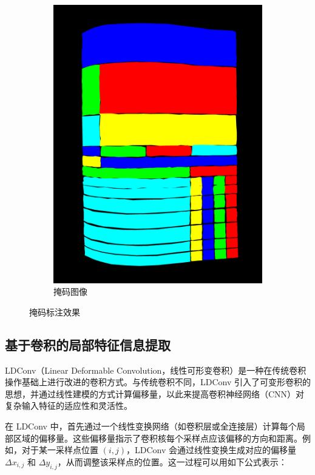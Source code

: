 \documentclass[UTF8,12pt, AutoFakeBold,fontset = founder]{ctexart}
\begin{document}
\begin{figure}[H]
\begin{subfigure}[b]{0.45\textwidth}
        \includegraphics[width=\textwidth]{../images/mask.png}
        \caption{掩码图像}
        \label{fig:mask}
    \end{subfigure}
    \caption{掩码标注效果}
    \label{fig:label}
\end{figure}

\subsection{基于卷积的局部特征信息提取}

LDConv（Linear Deformable Convolution，线性可形变卷积）是一种在传统卷积操作基础上进行改进的卷积方式。与传统卷积不同，LDConv 引入了可变形卷积的思想，并通过线性建模的方式计算偏移量，以此来提高卷积神经网络（CNN）对复杂输入特征的适应性和灵活性。

在 LDConv 中，首先通过一个线性变换网络（如卷积层或全连接层）计算每个局部区域的偏移量。这些偏移量指示了卷积核每个采样点应该偏移的方向和距离。例如，对于某一采样点位置 \( (i, j) \)，LDConv 会通过线性变换生成对应的偏移量 \( \Delta x_{i,j} \) 和 \( \Delta y_{i,j} \)，从而调整该采样点的位置。这一过程可以用如下公式表示：  
\end{document}
